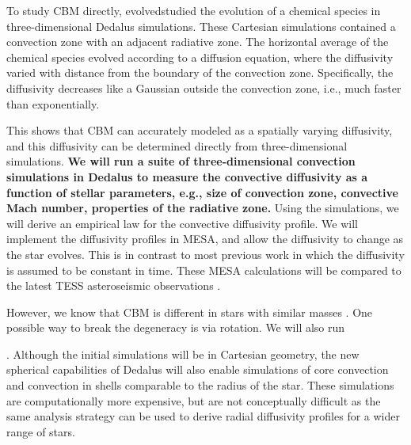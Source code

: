 To study CBM directly, \citet{Lecoanet_2016a} evolvedstudied the evolution of a chemical species in three-dimensional Dedalus simulations.  These Cartesian simulations contained a convection zone with an adjacent radiative zone. The horizontal average of the chemical species evolved according to a diffusion equation, where the diffusivity varied with distance from the boundary of the convection zone. Specifically, the diffusivity decreases like a Gaussian outside the convection zone, i.e., much faster than exponentially.

This shows that CBM can accurately modeled as a spatially varying diffusivity, and this diffusivity can be determined directly from three-dimensional simulations. \textbf{We will run a suite of three-dimensional convection simulations in Dedalus to measure the convective diffusivity as a function of stellar parameters, e.g., size of convection zone, convective Mach number, properties of the radiative zone.} Using the simulations, we will derive an empirical law for the convective diffusivity profile. We will implement the diffusivity profiles in MESA, and allow the diffusivity to change as the star evolves. This is in contrast to most previous work in which the diffusivity is assumed to be constant in time. These MESA calculations will be compared to the latest TESS asteroseismic observations \citep[similar to][]{Ghasemi_2016}.

However, we know that CBM is different in stars with similar masses \citep{Stancliffe_2015}. One possible way to break the degeneracy is via rotation. We will also run 

. Although the initial simulations will be in Cartesian geometry, the new spherical capabilities of Dedalus will also enable simulations of core convection and convection in shells comparable to the radius of the star. These simulations are computationally more expensive, but are not conceptually difficult as the same analysis strategy can be used to derive radial diffusivity profiles for a wider range of stars.
